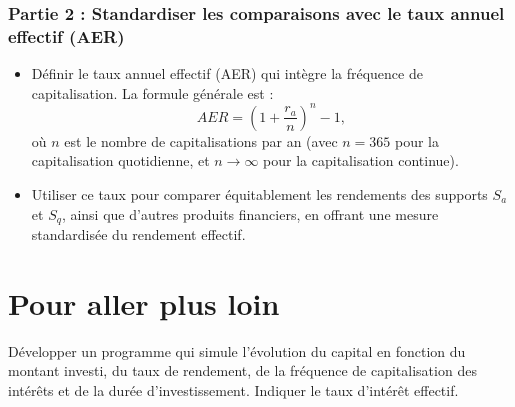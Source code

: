 \documentclass{article}
\begin{document}
\subsubsection*{Partie 2 : Standardiser les comparaisons avec le taux annuel effectif (AER)}
\begin{itemize}
    \item Définir le taux annuel effectif (AER) qui intègre la fréquence de capitalisation. La formule générale est :
    \[
    AER = \left(1 + \frac{r_a}{n}\right)^n - 1,
    \]
    où \( n \) est le nombre de capitalisations par an (avec \( n = 365 \) pour la capitalisation quotidienne, et \( n \to \infty \) pour la capitalisation continue).
    \item Utiliser ce taux pour comparer équitablement les rendements des supports \( S_a \) et \( S_q \), ainsi que d'autres produits financiers, en offrant une mesure standardisée du rendement effectif.
\end{itemize}

\section{Pour aller plus loin}
Développer un programme qui simule l'évolution du capital en fonction du montant investi, du taux de rendement, de la fréquence de capitalisation des intérêts et de la durée d'investissement. Indiquer le taux d'intérêt effectif.
\end{document}
